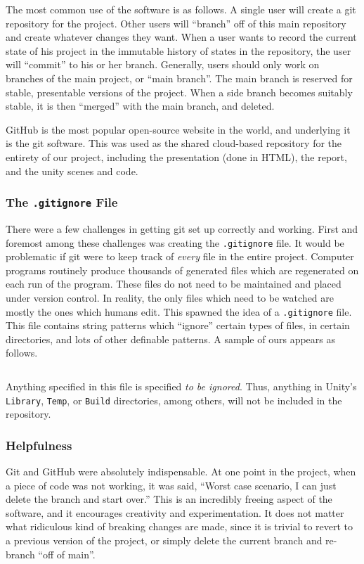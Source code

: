\documentclass[12pt]{article}
\begin{document}
The most common use of the software is as follows. A single user will create a git repository for the project. Other users will \enquote{branch} off of this main repository and create whatever changes they want. When a user wants to record the current state of his project in the immutable history of states in the repository, the user will \enquote{commit} to his or her branch. Generally, users should only work on branches of the main project, or \enquote{main branch}. The main branch is reserved for stable, presentable versions of the project. When a side branch becomes suitably stable, it is then \enquote{merged} with the main branch, and deleted.

GitHub is the most popular open-source website in the world, and underlying it is the git software. This was used as the shared cloud-based repository for the entirety of our project, including the presentation (done in HTML), the report, and the unity scenes and code.

\subsubsection{The \texttt{.gitignore} File}
There were a few challenges in getting git set up correctly and working. First and foremost among these challenges was creating the \texttt{.gitignore} file. It would be problematic if git were to keep track of \emph{every} file in the entire project. Computer programs routinely produce thousands of generated files which are regenerated on each run of the program. These files do not need to be maintained and placed under version control. In reality, the only files which need to be watched are mostly the ones which humans edit. This spawned the idea of a \texttt{.gitignore} file. This file contains string patterns which \enquote{ignore} certain types of files, in certain directories, and lots of other definable patterns. A sample of ours appears as follows.

\inputminted[firstline=0,lastline=10,linenos,fontsize=\footnotesize,bgcolor=codebg]{text}{../.gitignore}

Anything specified in this file is specified \emph{to be ignored}. Thus, anything in Unity's \texttt{Library}, \texttt{Temp}, or \texttt{Build} directories, among others, will not be included in the repository.

\subsubsection{Helpfulness}
Git and GitHub were absolutely indispensable. At one point in the project, when a piece of code was not working, it was said, \enquote{Worst case scenario, I can just delete the branch and start over.} This is an incredibly freeing aspect of the software, and it encourages creativity and experimentation. It does not matter what ridiculous kind of breaking changes are made, since it is trivial to revert to a previous version of the project, or simply delete the current branch and re-branch \enquote{off of main}.
\end{document}
